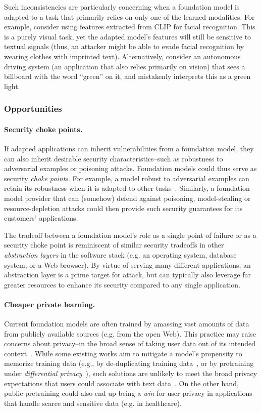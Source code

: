Such inconsistencies are particularly concerning when a foundation model is adapted to a task that primarily relies on only one of the learned modalities. For example, consider using features extracted from CLIP for facial recognition. This is a purely visual task, yet the adapted model's features will still be sensitive to textual signals (thus, an attacker might be able to evade facial recognition by wearing clothes with imprinted text). Alternatively, consider an autonomous driving system (an application that also relies primarily on vision) that sees a billboard with the word ``green'' on it, and mistakenly interprets this as a green light.

\subsubsection{Opportunities}
\paragraph{Security choke points.} If adapted applications can inherit vulnerabilities from a foundation model, they can also inherit desirable security characteristics--such as robustness to adversarial examples or poisoning attacks. Foundation models could thus serve as security \textit{choke points}. For example, a model robust to adversarial examples can retain its robustness when it is adapted to other tasks~\citep{shafahi2019adversarially}. Similarly, a foundation model provider that can (somehow) defend against poisoning, model-stealing or resource-depletion attacks could then provide such security guarantees for its customers' applications.

The tradeoff between a foundation model's role as a single point of failure or as a security choke point is reminiscent of similar security tradeoffs in other \emph{abstraction layers} in the software stack (e.g. an operating system, database system, or a Web browser). By virtue of serving many different applications, an abstraction layer is a prime target for attack, but can typically also leverage far greater resources to enhance its security compared to any single application.

\paragraph{Cheaper private learning.} Current foundation models are often trained by amassing vast amounts of data from publicly available sources (e.g. from the open Web). This practice may raise concerns about privacy--in the broad sense of taking user data out of its intended context~\citep{nissenbaum2004privacy, carlini2020extracting}. While some existing works aim to mitigate a model's propensity to memorize training data (e.g., by de-duplicating training data~\cite{lee2021deduplicating}, or by pretraining under \emph{differential privacy}~\citep{anil2021large}), such solutions are unlikely to meet the broad privacy expectations that users could associate with text data~\citep{brown2022does}. On the other hand, public pretraining could also end up being a \emph{win} for user privacy in applications that handle scarce and sensitive data (e.g. in healthcare). 

